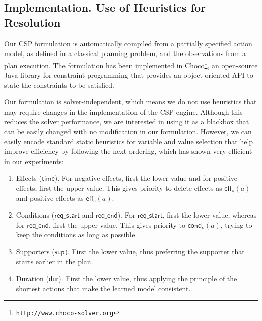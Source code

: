 \documentclass{ecai}
\newcommand{\eff}{\mathsf{eff}}    %
\newcommand{\cond}{\mathsf{cond}}  %
\newcommand{\dur}{\mathsf{dur}}    %
\newcommand{\supp}{\mathsf{sup}}   %
\newcommand{\tim}{\mathsf{time}}   %
\newcommand{\reqs}{\mathsf{req\_{start}}} %
\newcommand{\reqe}{\mathsf{req\_{end}}}   %
\begin{document}
\subsection{Implementation. Use of Heuristics for Resolution}
\label{sec:implementation}

Our CSP formulation is automatically compiled from a partially specified action model, as defined in a classical planning problem, and the observations from a plan execution.
The formulation has been implemented in \textsf{Choco}\footnote{\texttt{http://www.choco-solver.org}}, an open-source Java library for constraint programming that provides an object-oriented API to state the constraints to be satisfied.

Our formulation is solver-independent, which means we do not use heuristics that may require changes in the implementation of the CSP engine.
Although this reduces the solver performance, we are interested in using it as a blackbox that can be easily changed with no modification in our formulation. However, we can easily encode standard static heuristics for variable and value selection that help improve efficiency by following the next ordering, which has shown very efficient in our experiments:



\begin{enumerate}
  \item Effects ($\tim$). For negative effects, first the lower value and for positive effects, first the upper value. This gives priority to delete effects as $\eff_s(a)$ and positive effects as $\eff_e(a)$.
  \item Conditions ($\reqs$ and $\reqe$). For $\reqs$, first the lower value, whereas for $\reqe$, first the upper value. This gives priority to $\cond_o(a)$, trying to keep the conditions as long as possible.
  \item Supporters ($\supp$). First the lower value, thus preferring the supporter that starts earlier in the plan.
  \item Duration ($\dur$). First the lower value, thus applying the principle of the shortest actions that make the learned model consistent.
\end{enumerate}
\end{document}
